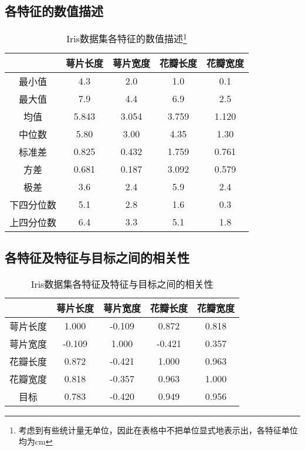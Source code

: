 \documentclass[12pt,a4paper]{article}
\theoremstyle{definition}
\begin{document}
\subsection{各特征的数值描述}

\begin{table}[htbp]
	\renewcommand\arraystretch{1.35}
	\caption{Iris数据集各特征的数值描述\protect\footnote{ 考虑到有些统计量无单位，因此在表格中不把单位显式地表示出，各特征单位均为cm}}
	\label{tab:iris_att}
	\centering
	
	\begin{tabular}{c|cccc}
		\centering
		 & 萼片长度 & 萼片宽度 & 花瓣长度 & 花瓣宽度 \\
		\hline
		最小值 & 4.3 & 2.0 & 1.0 & 0.1 \\
		最大值 & 7.9 & 4.4 & 6.9 & 2.5 \\
		均值 & 5.843 & 3.054 & 3.759 & 1.120 \\
		中位数 & 5.80 & 3.00 & 4.35 & 1.30 \\
		标准差 & 0.825 & 0.432 & 1.759 & 0.761 \\
		方差 & 0.681 & 0.187 & 3.092 & 0.579 \\
		极差 & 3.6 & 2.4 & 5.9 & 2.4 \\
		下四分位数 & 5.1 & 2.8 & 1.6 & 0.3 \\
		上四分位数 & 6.4 & 3.3 & 5.1 & 1.8 \\
	\end{tabular}
\end{table}

\subsection{各特征及特征与目标之间的相关性}

\begin{table}[htbp]
	\renewcommand\arraystretch{1.35}
	\caption{Iris数据集各特征及特征与目标之间的相关性}
	\label{tab:iris_co}
	\centering
	
	\begin{tabular}{c|cccc}
		\centering
		 & 萼片长度 & 萼片宽度 & 花瓣长度 & 花瓣宽度 \\
		\hline
		萼片长度 & 1.000 & -0.109 & 0.872 & 0.818 \\
		萼片宽度 & -0.109 & 1.000 & -0.421 & 0.357 \\
		花瓣长度 & 0.872 & -0.421 & 1.000 & 0.963 \\
		花瓣宽度 & 0.818 & -0.357 & 0.963 & 1.000 \\
		目标 & 0.783 & -0.420 & 0.949 & 0.956 \\
	\end{tabular}
\end{table}

\end{document}
